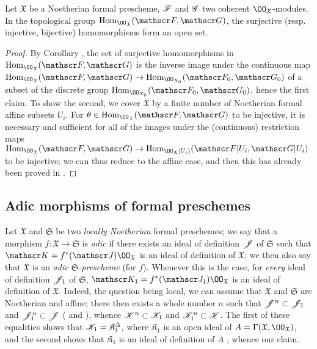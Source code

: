 \begin{prop}[10.11.9]
\label{1.10.11.9}
Let $\mathfrak{X}$ be a Noetherian formal prescheme, $\mathscr{F}$ and $\mathscr{G}$ two coherent $\OO_\mathfrak{X}$-modules.
In the topological group $\Hom_{\OO_\mathfrak{X}}(\sh{F},\sh{G})$, the surjective (resp. injective, bijective) homomorphisms form an open set.
\end{prop}

\begin{proof}
\label{proof-1.10.11.9}
By Corollary , the set of surjective homomorphisms in $\Hom_{\OO_\mathfrak{X}}(\sh{F},\sh{G})$ is the inverse image under the continuous map $\Hom_{\OO_\mathfrak{X}}(\sh{F},\sh{G})\to\Hom_{\OO_{X_0}}(\sh{F}_0,\sh{G}_0)$ of a subset of the discrete group $\Hom_{\OO_{X_0}}(\sh{F}_0,\sh{G}_0)$, hence the first claim.
To show the second, we cover $\mathfrak{X}$ by a finite number of Noetherian formal affine subsets $U_i$.
For $\theta\in\Hom_{\OO_\mathfrak{X}}(\sh{F},\sh{G})$ to be injective, it is necessary and sufficient for all of the images under the (continuous) restriction maps $\Hom_{\OO_\mathfrak{X}}(\sh{F},\sh{G})\to\Hom_{\OO_\mathfrak{X}|U_i)}(\sh{F}|U_i,\sh{G}|U_i)$ to be injective; we can thus reduce to the affine case, and then this has already been proved in .
\end{proof}

\subsection{Adic morphisms of formal preschemes}
\label{subsection:1.10.12}

\begin{env}[10.12.1]
\label{1.10.12.1}
Let $\mathfrak{X}$ and $\mathfrak{S}$ be two \emph{locally Noetherian} formal preschemes;
we say that a morphism $f:\mathfrak{X}\to\mathfrak{S}$ is \emph{adic} if there exists an ideal of definition $\mathscr{J}$ of $\mathfrak{S}$ such that $\sh{K}=f^*(\sh{J})\OO_\mathfrak{X}$ is an ideal of definition of $\mathfrak{X}$;
we then also say that $\mathfrak{X}$ is an \emph{adic $\mathfrak{S}$-prescheme} (for $f$).
Whenever this is the case, for \emph{every} ideal of definition $\mathscr{J}_1$ of $\mathfrak{S}$, $\sh{K}_1=f^*(\sh{J}_1)\OO_\mathfrak{X}$ is an ideal of definition of $\mathfrak{X}$.
Indeed, the question being local, we can assume that $\mathfrak{X}$ and $\mathfrak{S}$ are Noetherian and affine;
there then exists a whole number $n$ such that $\mathscr{J}^n\subset\mathscr{J}_1$ and $\mathscr{J}_1^n\subset\mathscr{J}$ ( and ), whence $\mathscr{K}^n\subset\mathscr{K}_1$ and $\mathscr{K}_1^n\subset\mathscr{K}$.
The first of these equalities shows that $\mathscr{K}_1=\mathfrak{K}_1^\Delta$, where $\mathfrak{K}_1$ is an open ideal of $A=\Gamma(\mathfrak{X},\OO_\mathfrak{X})$, and the second shows that $\mathfrak{K}_1$ is an ideal of definition of $A$ , whence our claim.
\end{env}

